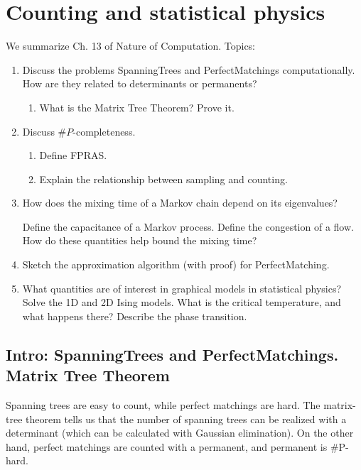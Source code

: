 
\section{Counting and statistical physics}

We summarize Ch. 13 of Nature of Computation. Topics:
\begin{enumerate}
\item
Discuss the problems SpanningTrees and PerfectMatchings computationally. How are they related to determinants or permanents?
\begin{enumerate}
\item
What is the Matrix Tree Theorem? Prove it.
\end{enumerate}
\item
Discuss $\#P$-completeness. 
\begin{enumerate}
\item 
Define FPRAS.
\item
Explain the relationship between sampling and counting.
\end{enumerate}
\item
How does the mixing time of a Markov chain depend on its eigenvalues?

Define the capacitance of a Markov process. Define the congestion of a flow. How do these quantities help bound the mixing time?
\item
Sketch the approximation algorithm (with proof) for PerfectMatching.
\item
What quantities are of interest in graphical models in statistical physics? Solve the 1D and 2D Ising models. What is the critical temperature, and what happens there? Describe the phase transition.
\end{enumerate}

\subsection{Intro: SpanningTrees and PerfectMatchings. Matrix Tree Theorem}

Spanning trees are easy to count, while perfect matchings are hard. The matrix-tree theorem tells us that the number of spanning trees can be realized with a determinant (which can be calculated with Gaussian elimination). On the other hand, perfect matchings are counted with a permanent, and permanent is $\#$P-hard.

